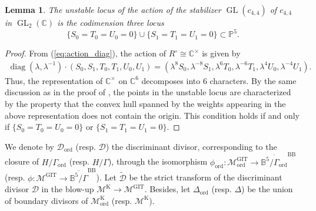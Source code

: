 \documentclass[12pt, pdftex]{amsart}
\theoremstyle{plain}
\newtheorem{lem}[thm]{Lemma}
\theoremstyle{definition}
\numberwithin{equation}{section}
\def\C{{\mathbb C}}
\def\P{{\mathbb P}}
\def\B{{\mathbb B}}
\def\GL{\mathop{\mathrm{GL}}\nolimits}
\def\diag{\mathop{\mathrm{diag}}\nolimits}
\def\ord{\mathrm{ord}}
\def\GIT{\mathrm{GIT}}
\def\K{\mathrm{K}}
\def\BB{\mathrm{BB}}
\def\M{\mathcal{M}}
\def\D{\mathscr{D}}
\begin{document}
\begin{lem}
\label{lem:unstable_locus}
The unstable locus of the action of the stabilizer $\GL(c_{4,4})$ of $c_{4,4}$ in $\GL_2(\C)$ 
is the codimension three locus
\[\{S_0=T_0=U_0=0\}\cup\{S_1=T_1=U_1=0\}\subset\P^5.\]
\end{lem}
\begin{proof}
From (\ref{eq:action_diag}), the action of $R^{\circ}\cong\C^{\times}$ is given by 
\begin{align*}
    \diag(\lambda,\lambda^{-1})\cdot (S_0,S_1,T_0,T_1,U_0,U_1)=(\lambda^8S_0,\lambda^{-8}S_1,\lambda^6T_0,\lambda^{-6}T_1,\lambda^4U_0,\lambda^{-4}U_1).
\end{align*}
Thus, the representation of  $\C^{\times}$ on $\C^6$ decomposes into 6 characters.
By the same discussion as in the proof of \cite[Lemma 3.6]{CMGHL22},  the points in the unstable locus are characterized 
by the property that the convex hull spanned by the weights appearing in the above representation does not contain the origin.
This condition holds if and only if $\{S_0=T_0=U_0=0\}$ or $\{S_1=T_1=U_1=0\}$.
\end{proof}

We denote by $\D_{\ord}$ (resp. $\D$) the discriminant divisor, corresponding to the closure of $H/\Gamma_{\ord}$ (resp. $H/\Gamma$), through the isomorphism $\phi_{\ord}:\M_{\ord}^{\GIT}\to\overline{\B^5/\Gamma_{\ord}}^{\BB}$ (resp. $\phi:\M^{\GIT}\to\overline{\B^5/\Gamma}^{\BB}$).
Let $\widetilde{\D}$ be the strict transform of the discriminant divisor $\D$ in the blow-up $\M^{\K}\to\M^{\GIT}$.
Besides, let $\Delta_{\ord}$ (resp. $\Delta$) be the union of boundary divisors of $\M^{\K}_{\ord}$ (resp. $\M^{\K}$).
\end{document}

